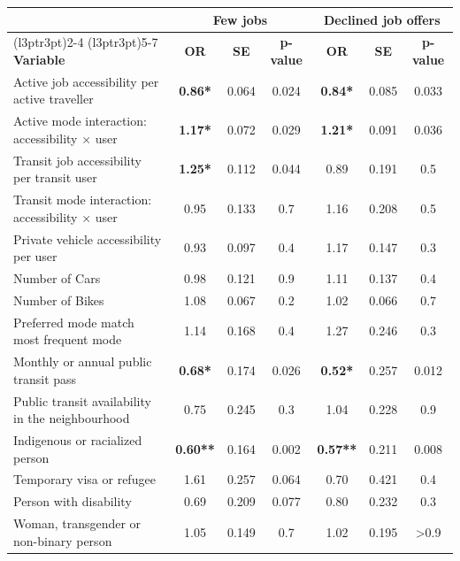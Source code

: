 \documentclass[preprint, 3p,
authoryear]{elsarticle} %
\providecommand{\DIFaddbeginFL}{} %
\providecommand{\DIFdelendFL}{} %
\newcommand{\DIFaddincludegraphics}[2][]{{\color{blue}\fbox{\DIFOincludegraphics[#1]{#2}}}} %
\DeclareRobustCommand{\DIFaddbeginFL}{\DIFOaddbeginFL \let\includegraphics\DIFaddincludegraphics} %
\DeclareRobustCommand{\DIFdelendFL}{\DIFOaddendFL \let\includegraphics\DIFOincludegraphics} %
\begin{document}
\begin{table}
\DIFdelendFL \DIFaddbeginFL \begin{tabular}[t]{lcccccc}
\toprule
\multicolumn{1}{c}{ } & \multicolumn{3}{c}{\textbf{Few jobs}} & \multicolumn{3}{c}{\textbf{Declined job offers}} \\
\cmidrule(l{3pt}r{3pt}){2-4} \cmidrule(l{3pt}r{3pt}){5-7}
\textbf{Variable} & \textbf{OR} & \textbf{SE} & \textbf{p-value} & \textbf{OR} & \textbf{SE} & \textbf{p-value}\\
\midrule
Active job accessibility per active traveller & \textbf{0.86*} & 0.064 & 0.024 & \textbf{0.84*} & 0.085 & 0.033\\
Active mode interaction: accessibility × user & \textbf{1.17*} & 0.072 & 0.029 & \textbf{1.21*} & 0.091 & 0.036\\
Transit job accessibility per transit user & \textbf{1.25*} & 0.112 & 0.044 & 0.89 & 0.191 & 0.5\\
Transit mode interaction: accessibility × user & 0.95 & 0.133 & 0.7 & 1.16 & 0.208 & 0.5\\
Private vehicle accessibility per user & 0.93 & 0.097 & 0.4 & 1.17 & 0.147 & 0.3\\
\addlinespace
Number of Cars & 0.98 & 0.121 & 0.9 & 1.11 & 0.137 & 0.4\\
Number of Bikes & 1.08 & 0.067 & 0.2 & 1.02 & 0.066 & 0.7\\
Preferred mode match most frequent mode & 1.14 & 0.168 & 0.4 & 1.27 & 0.246 & 0.3\\
Monthly or annual public transit pass & \textbf{0.68*} & 0.174 & 0.026 & \textbf{0.52*} & 0.257 & 0.012\\
Public transit availability in the neighbourhood & 0.75 & 0.245 & 0.3 & 1.04 & 0.228 & 0.9\\
\addlinespace
Indigenous or racialized person & \textbf{0.60**} & 0.164 & 0.002 & \textbf{0.57**} & 0.211 & 0.008\\
Temporary visa or refugee & 1.61 & 0.257 & 0.064 & 0.70 & 0.421 & 0.4\\
Person with disability & 0.69 & 0.209 & 0.077 & 0.80 & 0.232 & 0.3\\
Woman, transgender or non-binary person & 1.05 & 0.149 & 0.7 & 1.02 & 0.195 & >0.9\\

\end{tabular}
\end{table}
\end{document}
